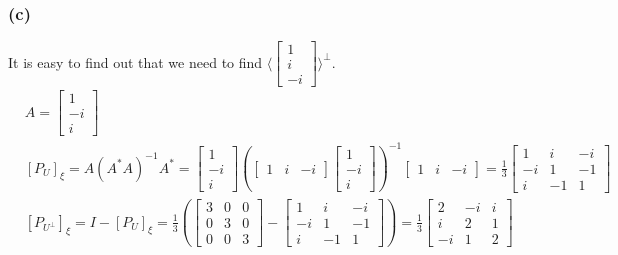 \documentclass{article}
\begin{document}
\subsubsection*{(c)}
It is easy to find out that we need to find $\langle \begin {bmatrix}
    1 \\ i \\ -i
\end{bmatrix}\rangle ^ {\bot}$. 
\begin{equation*}
    \begin{split}
        &A = \begin{bmatrix}
            1 \\
            -i \\
            i 
        \end{bmatrix}\\
        &[P_U]_\xi = A(A^*A)^{-1}A^* = \begin{bmatrix}
            1 \\
            -i \\
            i   
        \end{bmatrix} (\begin{bmatrix}
            1 & i & -i 
        \end{bmatrix} \begin{bmatrix}
            1 \\
            -i \\
            i 
        \end{bmatrix})^{-1} \begin{bmatrix}
            1 & i & -i 
        \end{bmatrix} = \frac{1}{3}\begin{bmatrix}
                1 & i & -i \\
                -i & 1 & -1 \\
                i & -1 & 1
        \end{bmatrix} \\
        & [P_{U^{\bot}}]_\xi = I - [P_U]_\xi = \frac{1}{3}(\begin{bmatrix}
            3 & 0 & 0 \\
            0 & 3 & 0 \\
            0 & 0 & 3 
    \end{bmatrix} - \begin{bmatrix}
        1 & i & -i \\
        -i & 1 & -1 \\
        i & -1 & 1
        \end{bmatrix}) = \frac{1}{3}\begin{bmatrix}
            2 & -i & i \\
            i & 2 & 1 \\
            -i & 1 & 2
    \end{bmatrix}
    \end{split}
\end{equation*}
\end{document}
